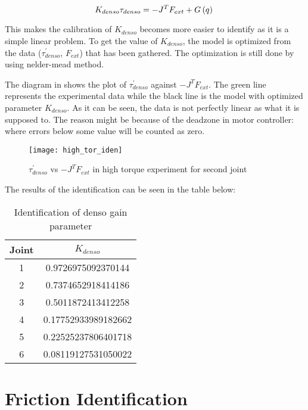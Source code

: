 \begin{equation}
  K_{denso} \tau_{denso} = - J^{T} F_{ext} + G\left(q \right) \\
\end{equation}

This makes the calibration of $K_{denso}$ becomes more easier to identify as it is a simple linear problem. To get the value of $K_{denso}$, the model is optimized from the data ($\tau_{denso}^{\prime}$, $F_{ext}$) that has been gathered. The optimization is still done by using nelder-mead method. 

The diagram in  shows the plot of $\tau_{denso}^{\prime}$ against $- J^{T} F_{ext}$. The green line represents the experimental data while the black line is the model with optimized parameter $K_{denso}$. As it can be seen, the data is not perfectly linear as what it is supposed to. The reason might be because of the deadzone in motor controller: where errors below some value will be counted as zero. 

\begin{figure}[h]
    \centering
    \texttt{[image: high\_tor\_iden]}
    \caption{$\tau_{denso}^{\prime}$ vs $- J^{T} F_{ext}$ in high torque experiment for second joint}
    \label{fig: tor calibration}
\end{figure}

The results of the identification can be seen in the table below:
\begin{table}[H]
    \centering
    \begin{tabular}{| c | c |}
    \hline
    Joint & $K_{denso}$             \\ \hline
    1     & 0.9726975092370144      \\ \hline
    2     & 0.7374652918414186      \\ \hline
    3     & 0.5011872413412258      \\ \hline
    4     & 0.17752933989182662     \\ \hline
    5     & 0.22525237806401718     \\ \hline
    6     & 0.08119127531050022     \\ \hline
    \end{tabular}
    \caption{Identification of denso gain parameter}
    \label{table:denso_gain}
\end{table}

\section{Friction Identification}

